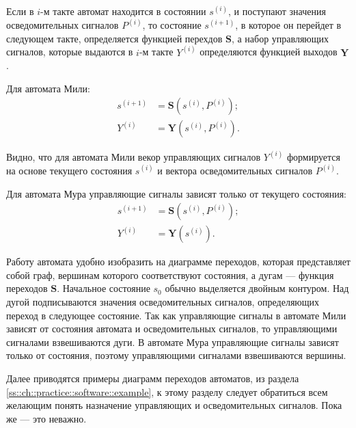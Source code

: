 Если в $i$-м такте автомат находится в состоянии $s^{(i)}$, и поступают значения осведомительных сигналов $P^{(i)}$, то состояние $s^{(i+1)}$, в которое он перейдет в следующем такте, определяется функцией перехдов $\mathbf{S}$, а набор управляющих сигналов, которые выдаются в $i$-м такте $Y^{(i)}$ определяются функцией выходов $\mathbf{Y}$.

Для автомата Мили:
\begin{equation}
    \begin{aligned}
        s^{(i+1)}&=\mathbf{S}(s^{(i)}, P^{(i)});\\
        Y^{(i)}  &=\mathbf{Y}(s^{(i)}, P^{(i)}).
    \end{aligned}
    \label{eq::ch::practice::programming::Mili}
\end{equation}

Видно, что для автомата Мили векор управляющих сигналов $Y^{(i)}$ формируется на основе текущего состояния $s^{(i)}$ и вектора осведомительных сигналов $P^{(i)}$.

Для автомата Мура управляющие сигналы зависят только от текущего состояния:
\begin{equation}
    \begin{aligned}
        s^{(i+1)}&=\mathbf{S}(s^{(i)}, P^{(i)});\\
        Y^{(i)}  &=\mathbf{Y}(s^{(i)}).
    \end{aligned}
    \label{eq::ch::practice::programming::Moore}
\end{equation}

Работу автомата удобно изобразить на диаграмме переходов, которая представляет собой граф, вершинам которого соответствуют состояния, а дугам --- функция переходов $\mathbf{S}$. Начальное состояние $s_0$ обычно выделяется двойным контуром. Над дугой подписываются значения осведомительных сигналов, определяющих переход в следующее состояние. Так как управляющие сигналы в автомате Мили зависят от состояния автомата и осведомительных сигналов, то управляющими сигналами взвешиваются дуги. В автомате Мура управляющие сигналы зависят только от состояния, поэтому управляющими сигналами взвешиваются вершины.

Далее приводятся примеры диаграмм переходов автоматов, из раздела \ref{ss::ch::practice::software::example}, к этому разделу следует обратиться всем желающим понять назначение управляющих и осведомительных сигналов. Пока же --- это неважно.

